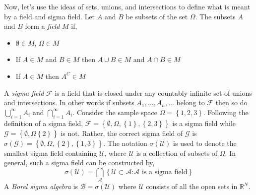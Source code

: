 Now, let's use the ideas of sets, unions, and intersections to define what is meant by a field and sigma field. Let $A$ and $B$ be subsets of the set $\Omega$. The subsets $A$ and $B$ form a \textit{field} $M$ if,
\begin{itemize}
   \item $\emptyset\in M$, $\Omega\in M$
   \item If $A\in M$ and $B\in M$ then $A\cup B\in M$ and $A\cap B\in M$
   \item If $A\in M$ then $A^C\in M$ 
\end{itemize}
A \textit{sigma field} $\mathcal{F}$ is a field that is closed under any countably infinite set of unions and intersections. In other words if subsets $A_1,...,A_n,...$ belong to $\mathcal{F}$ then so do $\bigcup_{i=1}^{\infty} A_i$ and $\bigcap_{i=1}^{\infty} A_i$. Consider the sample space $\Omega= \left\lbrace 1,2,3\right\rbrace$. Following the definition of a sigma field, $\mathcal{F} = \left\lbrace \emptyset, \Omega,\left\lbrace 1\right\rbrace, \left\lbrace 2,3\right\rbrace \right\rbrace$ 
is a sigma field while $\mathcal{G} = \left\lbrace \emptyset,\Omega \left\lbrace2\right\rbrace \right\rbrace$ is not. Rather, the correct sigma field of $\mathcal{G}$ is $\sigma\left(\mathcal{G}\right) = \left\lbrace \emptyset, \Omega, \left\lbrace2\right\rbrace, \left\lbrace 1,3\right\rbrace\right\rbrace$. The notation $\sigma\left(\mathcal{U}\right)$ is used to denote the smallest sigma field containing $\mathcal{U}$, where $\mathcal{U}$ is a collection of subsets of $\Omega$. In general, such a sigma field can be constructed by,
\begin{equation} \label{eq:construct_sigma_algebra}
   \sigma\left(\mathcal{U}\right) = \bigcap_{\mathcal{A}}
     \left\lbrace \mathcal{U} \subset \mathcal{A} 
     \textrm{:} \mathcal{A} \textrm{ is a sigma field} \right\rbrace 
\end{equation}        
A \textit{Borel sigma algebra} is $\mathcal{B} = \sigma\left( \mathcal{U}\right)$ where $\mathcal{U}$ consists of all the open sets in $\mathbb{R}^N$.

